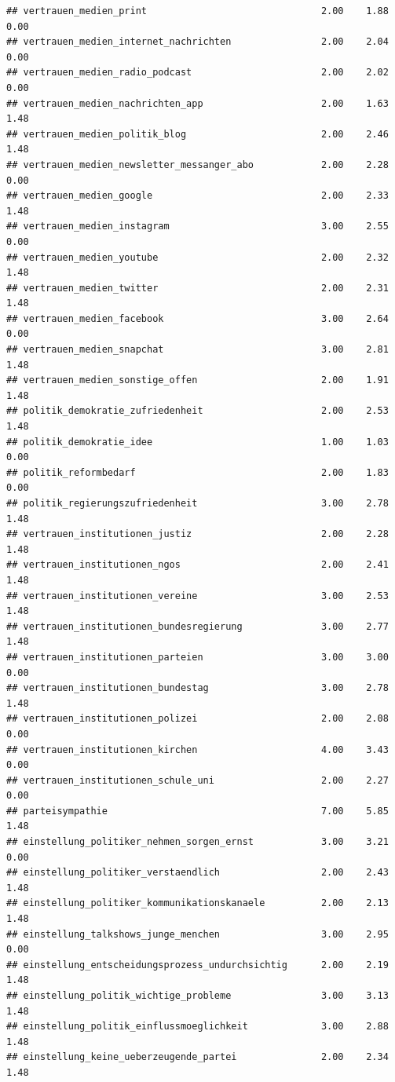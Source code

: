 \documentclass[
]{book}
\begin{document}
\begin{verbatim}
## vertrauen_medien_print                               2.00    1.88   0.00
## vertrauen_medien_internet_nachrichten                2.00    2.04   0.00
## vertrauen_medien_radio_podcast                       2.00    2.02   0.00
## vertrauen_medien_nachrichten_app                     2.00    1.63   1.48
## vertrauen_medien_politik_blog                        2.00    2.46   1.48
## vertrauen_medien_newsletter_messanger_abo            2.00    2.28   0.00
## vertrauen_medien_google                              2.00    2.33   1.48
## vertrauen_medien_instagram                           3.00    2.55   0.00
## vertrauen_medien_youtube                             2.00    2.32   1.48
## vertrauen_medien_twitter                             2.00    2.31   1.48
## vertrauen_medien_facebook                            3.00    2.64   0.00
## vertrauen_medien_snapchat                            3.00    2.81   1.48
## vertrauen_medien_sonstige_offen                      2.00    1.91   1.48
## politik_demokratie_zufriedenheit                     2.00    2.53   1.48
## politik_demokratie_idee                              1.00    1.03   0.00
## politik_reformbedarf                                 2.00    1.83   0.00
## politik_regierungszufriedenheit                      3.00    2.78   1.48
## vertrauen_institutionen_justiz                       2.00    2.28   1.48
## vertrauen_institutionen_ngos                         2.00    2.41   1.48
## vertrauen_institutionen_vereine                      3.00    2.53   1.48
## vertrauen_institutionen_bundesregierung              3.00    2.77   1.48
## vertrauen_institutionen_parteien                     3.00    3.00   0.00
## vertrauen_institutionen_bundestag                    3.00    2.78   1.48
## vertrauen_institutionen_polizei                      2.00    2.08   0.00
## vertrauen_institutionen_kirchen                      4.00    3.43   0.00
## vertrauen_institutionen_schule_uni                   2.00    2.27   0.00
## parteisympathie                                      7.00    5.85   1.48
## einstellung_politiker_nehmen_sorgen_ernst            3.00    3.21   0.00
## einstellung_politiker_verstaendlich                  2.00    2.43   1.48
## einstellung_politiker_kommunikationskanaele          2.00    2.13   1.48
## einstellung_talkshows_junge_menchen                  3.00    2.95   0.00
## einstellung_entscheidungsprozess_undurchsichtig      2.00    2.19   1.48
## einstellung_politik_wichtige_probleme                3.00    3.13   1.48
## einstellung_politik_einflussmoeglichkeit             3.00    2.88   1.48
## einstellung_keine_ueberzeugende_partei               2.00    2.34   1.48

\end{verbatim}
\end{document}
